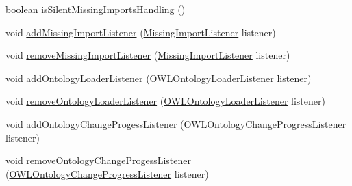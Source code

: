 \begin{DoxyCompactItemize}
\item 
boolean \hyperlink{classuk_1_1ac_1_1manchester_1_1cs_1_1owl_1_1owlapi_1_1_o_w_l_ontology_manager_impl_a125c2ea4ab300d984f9a99c6d16aa72c}{is\-Silent\-Missing\-Imports\-Handling} ()
\item 
void \hyperlink{classuk_1_1ac_1_1manchester_1_1cs_1_1owl_1_1owlapi_1_1_o_w_l_ontology_manager_impl_a8a0723ebce3d2f5dfa2a6491809bf480}{add\-Missing\-Import\-Listener} (\hyperlink{interfaceorg_1_1semanticweb_1_1owlapi_1_1model_1_1_missing_import_listener}{Missing\-Import\-Listener} listener)
\item 
void \hyperlink{classuk_1_1ac_1_1manchester_1_1cs_1_1owl_1_1owlapi_1_1_o_w_l_ontology_manager_impl_a90927cbf3c5c179210d4877b611575c2}{remove\-Missing\-Import\-Listener} (\hyperlink{interfaceorg_1_1semanticweb_1_1owlapi_1_1model_1_1_missing_import_listener}{Missing\-Import\-Listener} listener)
\item 
void \hyperlink{classuk_1_1ac_1_1manchester_1_1cs_1_1owl_1_1owlapi_1_1_o_w_l_ontology_manager_impl_a19d5e58d3ce6108a4d1eff0592ff9358}{add\-Ontology\-Loader\-Listener} (\hyperlink{interfaceorg_1_1semanticweb_1_1owlapi_1_1model_1_1_o_w_l_ontology_loader_listener}{O\-W\-L\-Ontology\-Loader\-Listener} listener)
\item 
void \hyperlink{classuk_1_1ac_1_1manchester_1_1cs_1_1owl_1_1owlapi_1_1_o_w_l_ontology_manager_impl_a3a38c67edc6acc3c7189592113f3cb8d}{remove\-Ontology\-Loader\-Listener} (\hyperlink{interfaceorg_1_1semanticweb_1_1owlapi_1_1model_1_1_o_w_l_ontology_loader_listener}{O\-W\-L\-Ontology\-Loader\-Listener} listener)
\item 
void \hyperlink{classuk_1_1ac_1_1manchester_1_1cs_1_1owl_1_1owlapi_1_1_o_w_l_ontology_manager_impl_aea91a917ccaae60586ce24ef827f3f7a}{add\-Ontology\-Change\-Progess\-Listener} (\hyperlink{interfaceorg_1_1semanticweb_1_1owlapi_1_1model_1_1_o_w_l_ontology_change_progress_listener}{O\-W\-L\-Ontology\-Change\-Progress\-Listener} listener)
\item 
void \hyperlink{classuk_1_1ac_1_1manchester_1_1cs_1_1owl_1_1owlapi_1_1_o_w_l_ontology_manager_impl_a6d37d2227f66329f23470a35e0894eb5}{remove\-Ontology\-Change\-Progess\-Listener} (\hyperlink{interfaceorg_1_1semanticweb_1_1owlapi_1_1model_1_1_o_w_l_ontology_change_progress_listener}{O\-W\-L\-Ontology\-Change\-Progress\-Listener} listener)
\end{DoxyCompactItemize}
